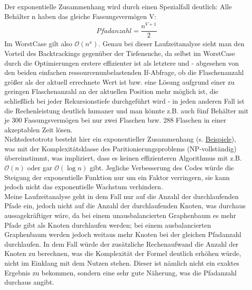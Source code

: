 \documentclass[10pt,a4paper]{scrartcl}
\begin{document}
Der exponentielle Zusammenhang wird durch einen Spezialfall deutlich: Alle Behälter n haben das gleiche Fassungsvermögen V:
\begin{align}
	Pfadanzahl=\dfrac{n^{V+1}}{2} \label{eq:WorstExpoCase}
\end{align}
Im WorstCase gilt also $\mathcal{O} {(n^{x})}$. Genau bei dieser Laufzeitanalyse sieht man den Vorteil des \glqq{}Backtrackings\grqq{} gegenüber der \glqq{}Tiefensuche\grqq{}, da selbst im WorstCase durch die Optimierungen erstere effizienter ist als letztere und - abgesehen von den beiden einfachen ressourcenunbelastenden If-Abfrage, ob die Flaschenanzahl größer als der aktuell errechnete Wert ist bzw. eine Lösung aufgrund einer zu geringen Flaschenanzahl an der aktuellen Position mehr möglich ist, die schließlich bei jeder Rekursionstiefe durchgeführt wird - in jeden anderen Fall ist die Rechenleistung deutlich humaner und man könnte z.B. auch fünf Behälter mit je 300 Fassungsvermögen bei nur zwei Flaschen bzw. 288 Flaschen in einer akzeptablen Zeit lösen.\\

Nichtsdestotrotz besteht hier ein exponentieller Zusammenhang (s. \hyperlink{section.3}{Beispiele}), was mit der Komplexitätsklasse des Paritionierungsproblems (NP-vollständig) übereinstimmt, was impliziert, dass es keinen effizienteren Algorithmus mit z.B. $\mathcal{O} {(n)}$ oder gar $\mathcal{O} {(\log{n})}$ gibt. Jegliche Verbesserung des Codes würde die Steigung der exponentielle Funktion nur um ein Faktor verringern, sie kann jedoch nicht das exponentielle Wachstum verhindern.\\

Meine Laufzeitanalyse geht in dem Fall nur auf die Anzahl der durchlaufenden Pfade ein, jedoch nicht auf die Anzahl der durchlaufenden Knoten, was durchaus aussagekräftiger wäre, da bei einem unausbalancierten Graphenbaum es mehr Pfade gibt als Knoten durchlaufen werden; bei einem ausbalancierten Graphenbaum werden jedoch weitaus mehr Knoten bei der gleichen Pfadanzahl durchlaufen. In dem Fall würde der zusätzliche Rechenaufwand die Anzahl der Knoten zu berechnen, was die Komplexität der Formel deutlich erhöhen würde, nicht im Einklang mit dem Nutzen stehen. Dieser ist nämlich nicht ein exaktes Ergebnis zu bekommen, sondern eine sehr gute Näherung, was die Pfadanzahl durchaus angibt.
\end{document}
